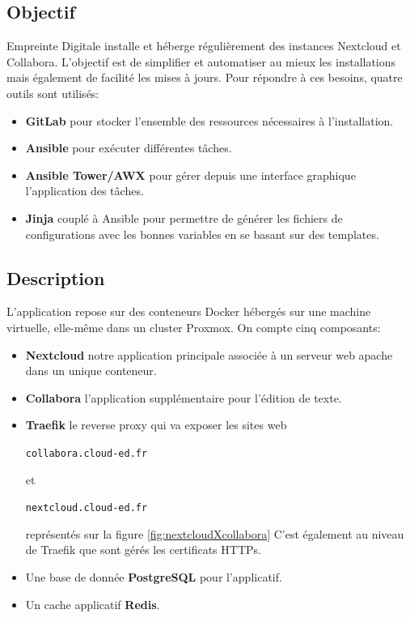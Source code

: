 \documentclass[12pt, a4paper, twoside]{article}
\begin{document}
\subsection{Objectif}
Empreinte Digitale installe et héberge régulièrement des instances \gls{Nextcloud} et \gls{Collabora}. 
L'objectif est de simplifier et automatiser au mieux les installations mais également de facilité les mises à jours.
Pour répondre à ces besoins, quatre outils sont utilisés:
\begin{itemize}
    \item \textbf{\gls{GitLab}} pour stocker l'ensemble des ressources nécessaires à l'installation.
    \item \textbf{\gls{Ansible}} pour exécuter différentes tâches.
    \item \textbf{\gls{Ansible} Tower/AWX} pour gérer depuis une interface graphique l'application des tâches.
    \item \textbf{\gls{Jinja}} couplé à \gls{Ansible} pour permettre de générer les fichiers de configurations avec les bonnes variables en se basant sur des templates.
\end{itemize}

\subsection{Description}
L'application repose sur des conteneurs Docker hébergés sur une machine virtuelle, elle-même dans un \gls{cluster} \gls{Proxmox}. On compte cinq composants:
\begin{itemize}
    \item \textbf{\gls{Nextcloud}} notre application principale associée à un serveur web apache dans un unique conteneur.
    \item \textbf{\gls{Collabora}} l'application supplémentaire pour l'édition de texte.
    \item \textbf{\gls{Traefik}} le reverse proxy qui va exposer les sites web \begin{code}\texttt{collabora.cloud-ed.fr}\end{code} et \begin{code}\texttt{nextcloud.cloud-ed.fr}\end{code} représentés sur la figure \ref{fig:nextcloudXcollabora}
    C'est également au niveau de \gls{Traefik} que sont gérés les certificats HTTPs.
    \item Une base de donnée \textbf{PostgreSQL} pour l'applicatif.
    \item Un cache applicatif \textbf{Redis}.
\end{itemize}
\end{document}
